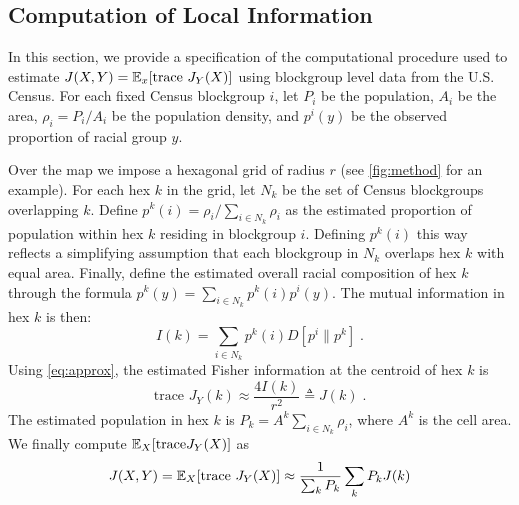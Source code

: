 \subsection*{Computation of Local Information}
	In this section, we provide a specification of the computational procedure used to estimate $J(X,Y) = \mathbb{E}_x[\text{trace } J_Y(X)]$ using blockgroup level data from the U.S. Census. For each fixed Census blockgroup $i$, let $P_i$ be the population, $A_i$ be the area, $\rho_i = P_i / A_i$ be the population density, and $p^i(y)$ be the observed proportion of racial group $y$. 

	Over the map we impose a hexagonal grid of radius $r$ (see \ref{fig:method} for an example). For each hex $k$ in the grid, let $N_k$ be the set of Census blockgroups overlapping $k$. Define $p^{k}(i) = \rho_i / \sum_{i \in N_k} \rho_i$ as the estimated proportion of population within hex $k$ residing in blockgroup $i$. Defining $p^k(i)$ this way reflects a simplifying assumption that each blockgroup in $N_k$ overlaps hex $k$ with equal area. Finally, define the estimated overall racial composition of hex $k$ through the formula $p^k(y) = \sum_{i \in N_k} p^{k}(i) p^i(y)$. The mutual information in hex $k$ is then: 
	\begin{equation}
		I(k) = \sum_{i \in N_k} p^k(i) D[p^i \| p^k]\;. 
	\end{equation}
	Using \eqref{eq:approx}, the estimated Fisher information at the centroid of hex $k$ is 
	\begin{equation}
		\text{trace } J_Y(k) \approx \frac{4 I(k)}{r^2} \triangleq J(k)\;.
	\end{equation}
	The estimated population in hex $k$ is $P_k = A^k\sum_{i \in N_k} \rho_i$, where $A^k$ is the cell area. We finally compute $\mathbb{E}_X[\text{trace} J_Y(X)]$ as 
	\begin{equation}
		J(X,Y) = \mathbb{E}_X[\text{trace }J_Y(X)] \approx \frac{1}{\sum_k P_k} \sum_k P_k J(k)
	\end{equation}



